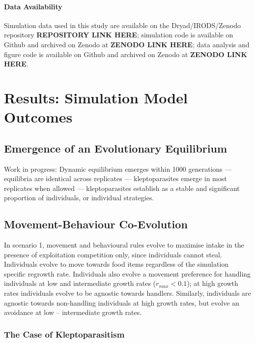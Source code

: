 \documentclass[11pt]{article}
\begin{document}
\paragraph*{Data Availability}

Simulation data used in this study are available on the Dryad/IRODS/Zenodo repository \textbf{REPOSITORY LINK HERE}; 
simulation code is available on Github and archived on Zenodo at \textbf{ZENODO LINK HERE}; 
data analysis and figure code is available on Github and archived on Zenodo at \textbf{ZENODO LINK HERE}.

\section{Results: Simulation Model Outcomes}

\subsection{Emergence of an Evolutionary Equilibrium}

Work in progress: Dynamic equilibrium emerges within 1000 generations --- equilibria are identical across replicates --- kleptoparasites emerge in most replicates when allowed --- kleptoparasites establish as a stable and significant proportion of individuals, or individual strategies.

\subsection{Movement-Behaviour Co-Evolution}

In scenario 1, movement and behavioural rules evolve to maximise intake in the presence of exploitation competition only, since individuals cannot steal.
Individuals evolve to move towards food items regardless of the simulation specific regrowth rate.
Individuals also evolve a movement preference for handling individuals at low and intermediate growth rates ($r_{max} < 0.1$); at high growth rates individuals evolve to be agnostic towards handlers.
Similarly, individuals are agnostic towards non-handling individuals at high growth rates, but evolve an avoidance at low -- intermediate growth rates.

\subsubsection{The Case of Kleptoparasitism}
\end{document}
